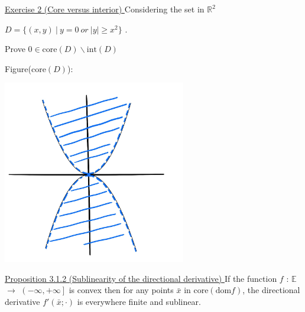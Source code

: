 \documentclass[a4paper,11pt]{jsarticle}
\begin{document}
\begin{itembox}[l]{\underline{Exercise 2 (Core versus interior) }}
  Considering the set in $\mathbb{R}^2$

  \begin{center}
    $D=\{(x,y) \:|\: y = 0 \:or\: |y| \geq x^2 \}$ .
  \end{center}

  Prove $0 \in \text{core} (D) \backslash \text{int} (D) $
\end{itembox}

Figure($\text{core} (D)$):



\begin{center}
  \includegraphics[width=8cm]{figures/core_versus_interior.png}
\end{center}

\begin{itembox}[l]{\underline{Proposition 3.1.2 (Sublinearity of the directional derivative) }}
  If the function $f$ : $\mathbb{E}$ $\to$ $ \left ( -\infty ,+\infty \right ] $ is convex then for any points $\bar{x}$ in $\text{core}(\text{dom} f)$, the directional derivative $f'(\bar{x};\cdot)$ is everywhere finite and sublinear.
\end{itembox}
\end{document}

